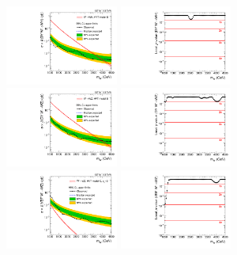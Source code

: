 \begin{figure}[htbp]
  \centering
  \includegraphics[width=0.33\textwidth]{fig/results/limits_WprToWH.pdf}
  \includegraphics[width=0.33\textwidth]{fig/results/pvalue_WprToWH.pdf}\\
  \includegraphics[width=0.33\textwidth]{fig/results/limits_WprToWZ.pdf}
  \includegraphics[width=0.33\textwidth]{fig/results/pvalue_WprToWZ.pdf}\\
  \includegraphics[width=0.33\textwidth]{fig/results/limits_VBFWprToWZ.pdf}
  \includegraphics[width=0.33\textwidth]{fig/results/pvalue_VBFWprToWZ.pdf}\\

\end{figure}
